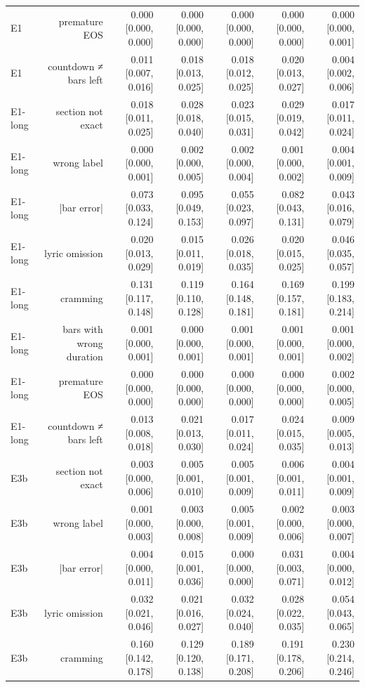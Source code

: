 \begin{table}[t]
\begin{tabular}{lrrrrrr}
E1 & premature EOS & 0.000 [0.000, 0.000] & 0.000 [0.000, 0.000] & 0.000 [0.000, 0.000] & 0.000 [0.000, 0.000] & 0.000 [0.000, 0.001] \\
E1 & countdown ≠ bars left & 0.011 [0.007, 0.016] & 0.018 [0.013, 0.025] & 0.018 [0.012, 0.025] & 0.020 [0.013, 0.027] & 0.004 [0.002, 0.006] \\
E1-long & section not exact & 0.018 [0.011, 0.025] & 0.028 [0.018, 0.040] & 0.023 [0.015, 0.031] & 0.029 [0.019, 0.042] & 0.017 [0.011, 0.024] \\
E1-long & wrong label & 0.000 [0.000, 0.001] & 0.002 [0.000, 0.005] & 0.002 [0.000, 0.004] & 0.001 [0.000, 0.002] & 0.004 [0.001, 0.009] \\
E1-long & |bar error| & 0.073 [0.033, 0.124] & 0.095 [0.049, 0.153] & 0.055 [0.023, 0.097] & 0.082 [0.043, 0.131] & 0.043 [0.016, 0.079] \\
E1-long & lyric omission & 0.020 [0.013, 0.029] & 0.015 [0.011, 0.019] & 0.026 [0.018, 0.035] & 0.020 [0.015, 0.025] & 0.046 [0.035, 0.057] \\
E1-long & cramming & 0.131 [0.117, 0.148] & 0.119 [0.110, 0.128] & 0.164 [0.148, 0.181] & 0.169 [0.157, 0.181] & 0.199 [0.183, 0.214] \\
E1-long & bars with wrong duration & 0.001 [0.000, 0.001] & 0.000 [0.000, 0.001] & 0.001 [0.000, 0.001] & 0.001 [0.000, 0.001] & 0.001 [0.000, 0.002] \\
E1-long & premature EOS & 0.000 [0.000, 0.000] & 0.000 [0.000, 0.000] & 0.000 [0.000, 0.000] & 0.000 [0.000, 0.000] & 0.002 [0.000, 0.005] \\
E1-long & countdown ≠ bars left & 0.013 [0.008, 0.018] & 0.021 [0.013, 0.030] & 0.017 [0.011, 0.024] & 0.024 [0.015, 0.035] & 0.009 [0.005, 0.013] \\
E3b & section not exact & 0.003 [0.000, 0.006] & 0.005 [0.001, 0.010] & 0.005 [0.001, 0.009] & 0.006 [0.001, 0.011] & 0.004 [0.001, 0.009] \\
E3b & wrong label & 0.001 [0.000, 0.003] & 0.003 [0.000, 0.008] & 0.005 [0.001, 0.009] & 0.002 [0.000, 0.006] & 0.003 [0.000, 0.007] \\
E3b & |bar error| & 0.004 [0.000, 0.011] & 0.015 [0.001, 0.036] & 0.000 [0.000, 0.000] & 0.031 [0.003, 0.071] & 0.004 [0.000, 0.012] \\
E3b & lyric omission & 0.032 [0.021, 0.046] & 0.021 [0.016, 0.027] & 0.032 [0.024, 0.040] & 0.028 [0.022, 0.035] & 0.054 [0.043, 0.065] \\
E3b & cramming & 0.160 [0.142, 0.178] & 0.129 [0.120, 0.138] & 0.189 [0.171, 0.208] & 0.191 [0.178, 0.206] & 0.230 [0.214, 0.246] \\

\end{tabular}
\end{table}
